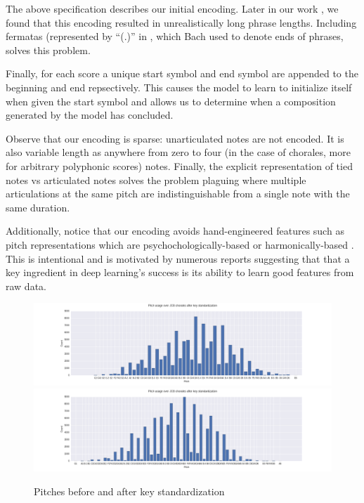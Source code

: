 \documentclass[dissertation.tex]{subfiles}
\begin{document}
The above specification describes our initial encoding. Later in our work
, we found that this encoding resulted in unrealistically long
phrase lengths. Including fermatas (represented by ``(.)'' in , which Bach used to denote ends of phrases, solves this problem.

Finally, for each score a unique start symbol %
and end symbol %
are appended to the beginning and end
repsectively. This causes the model to learn to initialize itself when given
the start symbol and allows us to determine when a composition generated by
the model has concluded.

Observe that our encoding is sparse: unarticulated notes are not encoded. It is
also variable length as anywhere from zero to four (in the case of chorales,
more for arbitrary polyphonic scores) notes. Finally, the explicit
representation of tied notes vs articulated notes solves the problem plaguing
\cite{Eck2002}\cite{eck2008learning} \cite{Liu2014} \cite{Brien2016} where
multiple articulations at the same pitch are indistinguishable from a single
note with the same duration.

Additionally, notice that our encoding avoids hand-engineered features such as
pitch representations which are psychochologically-based \cite{mozer1994neural}
or harmonically-based \cite{franklin2004recurrent}
\cite{laden1989representation}. This is intentional and is motivated by
numerous reports \cite{bengio2009learning}\cite{Bengio2011} suggesting that
that a key ingredient in deep learning's success is its ability to learn good
features from raw data.





\begin{figure}[htpb]
    \centering
    \includegraphics[width=1.0\linewidth]{Figures/pitch-usage-original.png}
    \includegraphics[width=1.0\linewidth]{Figures/pitch-usage-preproc.png}
    \caption{Pitches before and after key standardization}
    \label{fig:pitch-key-standardization}
\end{figure}
\end{document}
